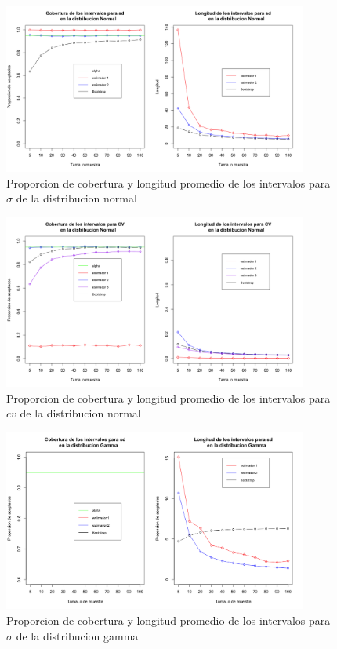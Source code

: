 \documentclass[letterpaper,12pt,onecolumn,titlepage]{article}
\begin{document}
\begin{figure}[!h]
    \begin{center}
        \includegraphics[width=10cm]{Figuras/Rplot.png}
        \caption{Proporcion de cobertura y longitud promedio de los intervalos para $\sigma$ de la distribucion normal}
        \label{fig:Densidad}
    \end{center}
\end{figure}

\begin{figure}[!h]
    \begin{center}
        \includegraphics[width=10cm]{Figuras/Rplot01.png}
        \caption{Proporcion de cobertura y longitud promedio de los intervalos para $cv$ de la distribucion normal}
        \label{fig:Densidad}
    \end{center}
\end{figure}

\begin{figure}[!h]
    \begin{center}
        \includegraphics[width=10cm]{Figuras/Rplot02.png}
        \caption{Proporcion de cobertura y longitud promedio de los intervalos para $\sigma$ de la distribucion gamma}
        \label{fig:Densidad}
    \end{center}
\end{figure}
\end{document}
